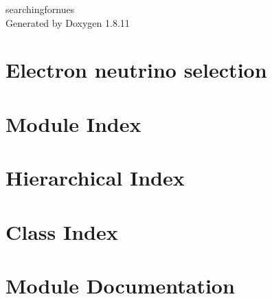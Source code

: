 \documentclass[twoside]{book}
\newcommand{\+}{\discretionary{\mbox{\scriptsize$\hookleftarrow$}}{}{}}
\newcommand{\clearemptydoublepage}{%
  \newpage{\pagestyle{empty}\cleardoublepage}%
}
\begin{document}
\hypersetup{pageanchor=false,
             bookmarksnumbered=true,
             pdfencoding=unicode
            }
\begin{titlepage}
\vspace*{7cm}
\begin{center}%
{\Large searchingfornues }\\
\vspace*{1cm}
{\large Generated by Doxygen 1.8.11}\\
\end{center}
\end{titlepage}
\clearemptydoublepage
\tableofcontents
\clearemptydoublepage
{}
\hypersetup{pageanchor=true}

\chapter{Electron neutrino selection}
\label{index}\hypertarget{index}{}
\chapter{Module Index}

\chapter{Hierarchical Index}

\chapter{Class Index}

\chapter{Module Documentation}

\end{document}
